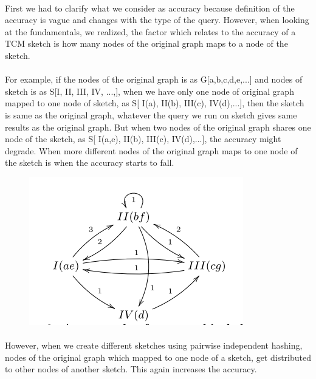 \documentclass[12pt]{report}
\numberwithin{figure}{section}
\numberwithin{table}{section}
\begin{document}
\paragraph{}

First we had to clarify what we consider as accuracy because definition of the accuracy is vague and changes with the type of the query. However, when looking at the fundamentals, we realized, the factor which relates to the accuracy of a TCM sketch is how many nodes of the original graph maps to a node of the sketch.

\paragraph{}

 For example, if the nodes of the original graph is as G[a,b,c,d,e,...] and nodes of sketch is as S[I, II, III, IV, ...,], when  we have only one node of original graph mapped to one node of sketch, as S[ I(a), II(b), III(c), IV(d),...], then the sketch is same as the original graph, whatever the query we run on sketch gives same results as the original graph. But when two nodes of the original graph shares one node of the sketch, as S[ I(a,e), II(b), III(c), IV(d),...], the accuracy might degrade. When more different nodes of the original graph maps to one node of the sketch is when the accuracy starts to fall.
 
\begin{figure}[H]
\centering
\includegraphics[scale=0.6]{images/example-tcm}
\end{figure}

\paragraph{}

 However, when we create different sketches using pairwise independent hashing,  nodes of the original graph which mapped to one node of a sketch, get distributed to other nodes of another sketch. This again increases the accuracy. 
\end{document}
